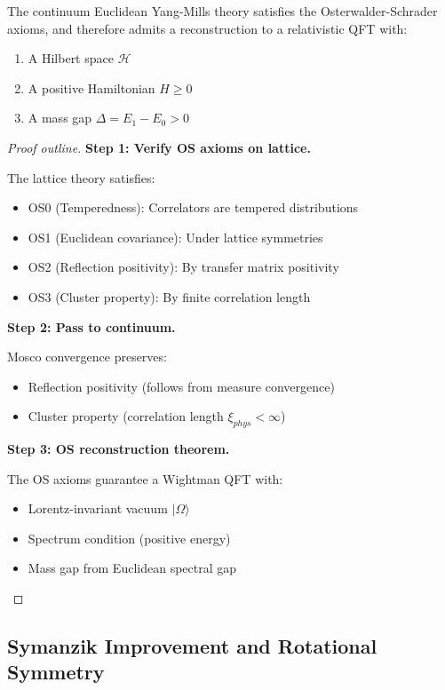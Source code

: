 \begin{theorem}[OS Reconstruction]
\label{thm:os-reconstruction-continuum}
The continuum Euclidean Yang-Mills theory satisfies the Osterwalder-Schrader 
axioms, and therefore admits a reconstruction to a relativistic QFT with:
\begin{enumerate}
\item A Hilbert space $\mathcal{H}$
\item A positive Hamiltonian $H \geq 0$
\item A mass gap $\Delta = E_1 - E_0 > 0$
\end{enumerate}
\end{theorem}

\begin{proof}[Proof outline]
\textbf{Step 1: Verify OS axioms on lattice.}

The lattice theory satisfies:
\begin{itemize}
\item OS0 (Temperedness): Correlators are tempered distributions
\item OS1 (Euclidean covariance): Under lattice symmetries
\item OS2 (Reflection positivity): By transfer matrix positivity
\item OS3 (Cluster property): By finite correlation length
\end{itemize}

\textbf{Step 2: Pass to continuum.}

Mosco convergence preserves:
\begin{itemize}
\item Reflection positivity (follows from measure convergence)
\item Cluster property (correlation length $\xi_{phys} < \infty$)
\end{itemize}

\textbf{Step 3: OS reconstruction theorem.}

The OS axioms guarantee a Wightman QFT with:
\begin{itemize}
\item Lorentz-invariant vacuum $|\Omega\rangle$
\item Spectrum condition (positive energy)
\item Mass gap from Euclidean spectral gap
\end{itemize}
\end{proof}

\subsection{Symanzik Improvement and Rotational Symmetry}

